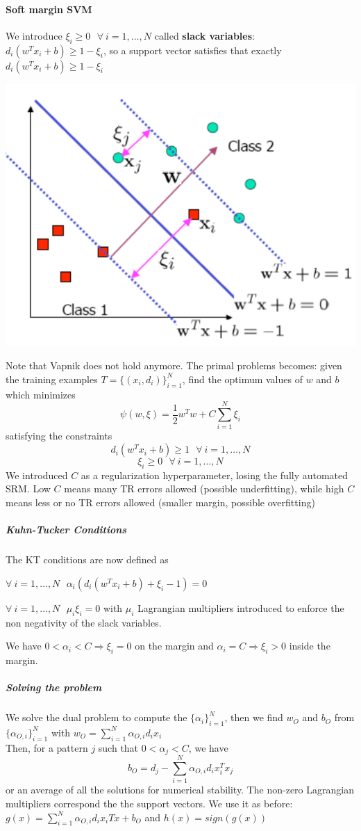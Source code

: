 \documentclass[10pt]{report}
\begin{document}
\paragraph{Soft margin SVM} We introduce $\xi_i\geq 0\:\:\:\forall\:i=1,\ldots, N$ called \textbf{slack variables}: $d_i(w^Tx_i+b)\geq 1-\xi_i$, so a support vector satisfies that exactly $d_i(w^Tx_i+b)\geq 1-\xi_i$
\begin{center}
	\includegraphics[scale=0.5]{21.png}
\end{center}
Note that Vapnik does not hold anymore. The primal problems becomes: given the training examples $T = \{(x_i, d_i)\}_{i=1}^N$, find the optimum values of $w$ and $b$ which minimizes $$\psi(w, \xi) = \frac{1}{2}w^Tw + C\sum_{i=1}^N\xi_i$$ satisfying the constraints $$d_i(w^Tx_i+b)\geq 1\:\:\:\forall\:i=1,\ldots,N$$ $$\xi_i\geq 0\:\:\:\forall\:i=1,	\ldots, N$$
We introduced $C$ as a regularization hyperparameter, losing the fully automated SRM. Low $C$ means many TR errors allowed (possible underfitting), while high $C$ means less or no TR errors allowed (smaller margin, possible overfitting)
\subparagraph{Kuhn-Tucker Conditions} The KT conditions are now defined as
\begin{list}{}{}
	\item $\forall\:i=1,\ldots,N\:\:\:\alpha_i(d_i(w^Tx_i + b)+\xi_i - 1) = 0$
	\item $\forall\:i=1,\ldots,N\:\:\:\mu_i\xi_i=0$ with $\mu_i$ Lagrangian multipliers introduced to enforce the non negativity of the slack variables.
\end{list}
We have $0<\alpha_i<C\Rightarrow\xi_i = 0$ on the margin and $\alpha_i=C\Rightarrow\xi_i > 0$ inside the margin.
\subparagraph{Solving the problem} We solve the dual problem to compute the $\{\alpha_i\}_{i=1}^N$, then we find $w_O$ and $b_O$ from $\{\alpha_{O,i}\}_{i=1}^N$ with $w_O = \sum_{i=1}^N\alpha_{O,i}d_ix_i$\\
Then, for a pattern $j$ such that $0<\alpha_j<C$, we have $$b_O = d_j-\sum_{i=1}^N\alpha_{O,i}d_ix_i^Tx_j$$
or an average of all the solutions for numerical stability. The non-zero Lagrangian multipliers correspond the the support vectors. We use it as before: $g(x) = \sum_{i=1}^N \alpha_{O,i}d_ix_iTx + b_O$ and $h(x) = sign(g(x))$
\end{document}

